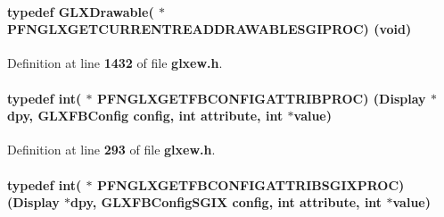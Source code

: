 \paragraph[{P\+F\+N\+G\+L\+X\+G\+E\+T\+C\+U\+R\+R\+E\+N\+T\+R\+E\+A\+D\+D\+R\+A\+W\+A\+B\+L\+E\+S\+G\+I\+P\+R\+OC}]{\setlength{\rightskip}{0pt plus 5cm}typedef {\bf G\+L\+X\+Drawable}( $\ast$  P\+F\+N\+G\+L\+X\+G\+E\+T\+C\+U\+R\+R\+E\+N\+T\+R\+E\+A\+D\+D\+R\+A\+W\+A\+B\+L\+E\+S\+G\+I\+P\+R\+OC) ({\bf void})}\label{glxew_8h_a4306c3df508d718823686f7868eafc6a}


Definition at line {\bf 1432} of file {\bf glxew.\+h}.

\paragraph[{P\+F\+N\+G\+L\+X\+G\+E\+T\+F\+B\+C\+O\+N\+F\+I\+G\+A\+T\+T\+R\+I\+B\+P\+R\+OC}]{\setlength{\rightskip}{0pt plus 5cm}typedef {\bf int}( $\ast$  P\+F\+N\+G\+L\+X\+G\+E\+T\+F\+B\+C\+O\+N\+F\+I\+G\+A\+T\+T\+R\+I\+B\+P\+R\+OC) (Display $\ast$dpy, {\bf G\+L\+X\+F\+B\+Config} config, {\bf int} attribute, {\bf int} $\ast$value)}\label{glxew_8h_ae4903396eebff5d5d66c60a0a8dde4bd}


Definition at line {\bf 293} of file {\bf glxew.\+h}.

\paragraph[{P\+F\+N\+G\+L\+X\+G\+E\+T\+F\+B\+C\+O\+N\+F\+I\+G\+A\+T\+T\+R\+I\+B\+S\+G\+I\+X\+P\+R\+OC}]{\setlength{\rightskip}{0pt plus 5cm}typedef {\bf int}( $\ast$  P\+F\+N\+G\+L\+X\+G\+E\+T\+F\+B\+C\+O\+N\+F\+I\+G\+A\+T\+T\+R\+I\+B\+S\+G\+I\+X\+P\+R\+OC) (Display $\ast$dpy, {\bf G\+L\+X\+F\+B\+Config\+S\+G\+IX} config, {\bf int} attribute, {\bf int} $\ast$value)}\label{glxew_8h_aebd988e527376b53bef873891e77c389}


